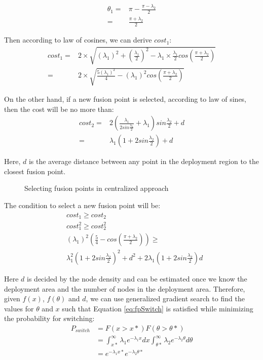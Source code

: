 \begin{align*}
{\theta}_1=&\pi - \frac{\pi - {\lambda}_2}{2} \\
=&\frac{\pi + {\lambda}_2}{2}
\end{align*}

Then according to law of cosines, we can derive \(cost_1\):
\begin{align*}
cost_1=&2\times \sqrt{({\lambda}_1)^2+(\frac{{\lambda}_1}{2})^2-{\lambda}_1 \times \frac{{\lambda}_1}{2}cos(\frac{\pi+{\lambda}_2}{2})} \\
=&2\times \sqrt{\frac{5({\lambda}_1)^2}{4} - ({\lambda}_1)^2cos(\frac{\pi+{\lambda}_2}{2})}
\end{align*}

On the other hand, if a new fusion point is selected, according to law of sines, then the cost will be no more than:
\begin{align*}
cost_2=&2(\frac{{\lambda}_1}{2sin\frac{{\lambda}_2}{2}}+{\lambda}_1)sin\frac{{\lambda}_2}{2}+d\\
=&{\lambda}_1(1+2sin\frac{{\lambda}_2}{2})+d
\end{align*}

Here, \(d\) is the average distance between any point in the deployment region to the closest fusion point. 

\begin{figure}
\centering
{}
\caption{Selecting fusion points in centralized approach}
\label{fig:centralizedTED}
\end{figure}

The condition to select a new fusion point will be:
\begin{align}
&cost_1\geq cost_2\nonumber \\
&cost_1^2\geq cost_2^2\nonumber \\
&({\lambda}_1)^2(\frac{5}{4}-cos(\frac{\pi+{\lambda}_2}{2}))\geq\nonumber \\ &{\lambda}_1^2(1+2sin\frac{{\lambda}_2}{2})^2+d^2+2{\lambda}_1(1+2sin\frac{{\lambda}_2}{2})d
\label{eq:fpSwitch}
\end{align}

Here \(d\) is decided by the node density and can be estimated once we know the deployment area and the number of nodes in the deployment area. Therefore, given \(f(x)\), \(f(\theta)\) and \(d\), we can use generalized gradient search to find the values for \(\theta\) and \(x\) such that Equation \ref{eq:fpSwitch} is satisfied while minimizing the probability for switching:
\begin{align*}
P_{switch}&=F(x>x*)F(\theta>\theta *)\\
&=\int_{x*}^{\infty}{\lambda}_1e^{-{\lambda}_1x}dx\int_{\theta *}^{\infty}{\lambda}_2e^{-{\lambda}_2\theta}d\theta\\
&=e^{-{\lambda}_1x*}e^{-{\lambda}_2\theta *}
\end{align*}


